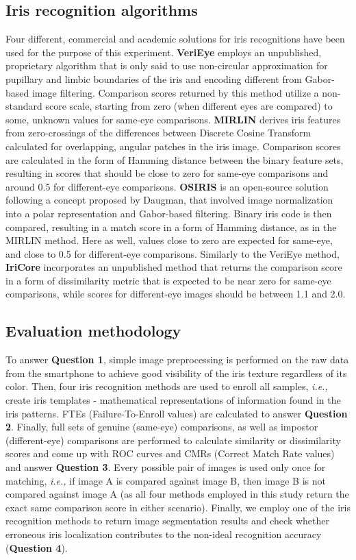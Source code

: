 \documentclass[10pt,twocolumn,letterpaper]{article}
\begin{document}
\subsection{Iris recognition algorithms}
Four different, commercial and academic solutions for iris recognitions have been used for the purpose of this experiment. \textbf{VeriEye} \cite{VeriEye} employs an unpublished, proprietary algorithm that is only said to use non-circular approximation for pupillary and limbic boundaries of the iris and encoding different from Gabor-based image filtering. Comparison scores returned by this method utilize a non-standard score scale, starting from zero (when different eyes are compared) to some, unknown values for same-eye comparisons. \textbf{MIRLIN}\cite{MIRLIN}\cite{Monro2007} derives iris features from zero-crossings of the differences between Discrete Cosine Transform calculated for overlapping, angular patches in the iris image. Comparison scores are calculated in the form of Hamming distance between the binary feature sets, resulting in scores that should be close to zero for same-eye comparisons and around 0.5 for different-eye comparisons. \textbf{OSIRIS} \cite{OSIRIS} is an open-source solution following a concept proposed by Daugman, that involved image normalization into a polar representation and Gabor-based filtering. Binary iris code is then compared, resulting in a match score in a form of Hamming distance, as in the MIRLIN method. Here as well, values close to zero are expected for same-eye, and close to 0.5 for different-eye comparisons. Similarly to the VeriEye method, \textbf{IriCore} \cite{IriCore} incorporates an unpublished method that returns the comparison score in a form of dissimilarity metric that is expected to be near zero for same-eye comparisons, while scores for different-eye images should be between 1.1 and 2.0.

\subsection{Evaluation methodology}
To answer \textbf{Question 1}, simple image preprocessing is performed on the raw data from the smartphone to achieve good visibility of the iris texture regardless of its color. Then, four iris recognition methods are used to enroll all samples, \emph{i.e.,} create iris templates - mathematical representations of information found in the iris patterns. FTEs (Failure-To-Enroll values) are calculated to answer \textbf{Question 2}. Finally, full sets of genuine (same-eye) comparisons, as well as impostor (different-eye) comparisons are performed to calculate similarity or dissimilarity scores and come up with ROC curves and CMRs (Correct Match Rate values) and answer \textbf{Question 3}. Every possible pair of images is used only once for matching, \emph{i.e.,} if image A is compared against image B, then image B is not compared against image A (as all four methods employed in this study return the exact same comparison score in either scenario). Finally, we employ one of the iris recognition methods to return image segmentation results and check whether erroneous iris localization contributes to the non-ideal recognition accuracy (\textbf{Question 4}).
\end{document}
